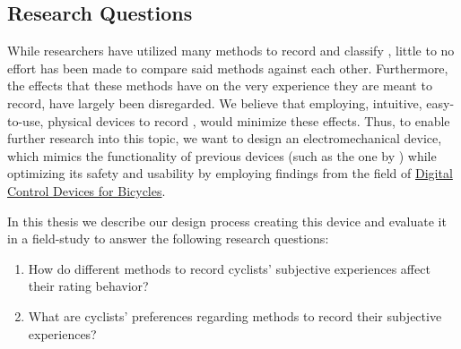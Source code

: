 \subsection{Research Questions}

While researchers have utilized many methods to record and classify \CSE, little to no effort has been made to compare said methods against each other.
Furthermore, the effects that these methods have on the very experience they are meant to record, have largely been disregarded.
We believe that employing, intuitive, easy-to-use, physical devices to record \CSE, would minimize these effects.
Thus, to enable further research into this topic, we want to design an electromechanical device, which mimics the functionality of previous devices (such as the one by ) while optimizing its safety and usability by employing findings from the field of \hyperref[subsec:digital_control_devices]{\textsf{Digital Control Devices for Bicycles}}.

\bigbreak\noindent
In this thesis we describe our design process creating this device and evaluate it in a field-study to answer the following research questions:

\vspace{-0.5em}
\begin{enumerate}[label=\textsf{Q\arabic*:}, left=1em .. 3em]
    \item How do different methods to record cyclists' subjective experiences affect their rating behavior?
    \item What are cyclists' preferences regarding methods to record their subjective experiences?
\end{enumerate}
